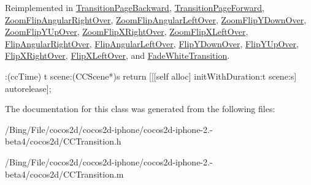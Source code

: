 Reimplemented in \hyperlink{interface_transition_page_backward_a6a7bf0fcfbe864540e59d903e767ee5f}{Transition\-Page\-Backward}, \hyperlink{interface_transition_page_forward_a68c1d8d67a754f1f08c84f6409c95ad1}{Transition\-Page\-Forward}, \hyperlink{interface_zoom_flip_angular_right_over_ad563cd362f2d7e67b1ab9a8441fac2de}{Zoom\-Flip\-Angular\-Right\-Over}, \hyperlink{interface_zoom_flip_angular_left_over_a4513047f0623b124c5aaa6aefcb9eac3}{Zoom\-Flip\-Angular\-Left\-Over}, \hyperlink{interface_zoom_flip_y_down_over_a5edfe5835fcb0452ca650c8e8740a598}{Zoom\-Flip\-Y\-Down\-Over}, \hyperlink{interface_zoom_flip_y_up_over_ae091fd516905ccbf5b0ef1c98a41a068}{Zoom\-Flip\-Y\-Up\-Over}, \hyperlink{interface_zoom_flip_x_right_over_af72b4cd03f570b0c9dfeb292a3b48ba3}{Zoom\-Flip\-X\-Right\-Over}, \hyperlink{interface_zoom_flip_x_left_over_a02ea166b544bb9aa7d3929f868453a51}{Zoom\-Flip\-X\-Left\-Over}, \hyperlink{interface_flip_angular_right_over_aae5b136f7052f7a7d6bd9144d5979cb5}{Flip\-Angular\-Right\-Over}, \hyperlink{interface_flip_angular_left_over_a79662759c592da63fcef3338d92a028d}{Flip\-Angular\-Left\-Over}, \hyperlink{interface_flip_y_down_over_a088eec965f50206e6e8aed7b1c466529}{Flip\-Y\-Down\-Over}, \hyperlink{interface_flip_y_up_over_aeed0c83e7e1f3440463177548c0afe58}{Flip\-Y\-Up\-Over}, \hyperlink{interface_flip_x_right_over_ad0cc0b1cf96645d238266b30792a8b93}{Flip\-X\-Right\-Over}, \hyperlink{interface_flip_x_left_over_ab304d13f86627bf8af81f5fa77e20e77}{Flip\-X\-Left\-Over}, and \hyperlink{interface_fade_white_transition_aba107ac0dc3d49d2e82204e24e644d26}{Fade\-White\-Transition}.


\begin{DoxyCode}
                            :(ccTime) t scene:(CCScene*)s
{
        return [[[self alloc] initWithDuration:t scene:s] autorelease];
}
\end{DoxyCode}


The documentation for this class was generated from the following files\-:\begin{DoxyCompactItemize}
\item 
/\-Bing/\-File/cocos2d/cocos2d-\/iphone/cocos2d-\/iphone-\/2.-\/beta4/cocos2d/C\-C\-Transition.\-h\item 
/\-Bing/\-File/cocos2d/cocos2d-\/iphone/cocos2d-\/iphone-\/2.-\/beta4/cocos2d/C\-C\-Transition.\-m\end{DoxyCompactItemize}
